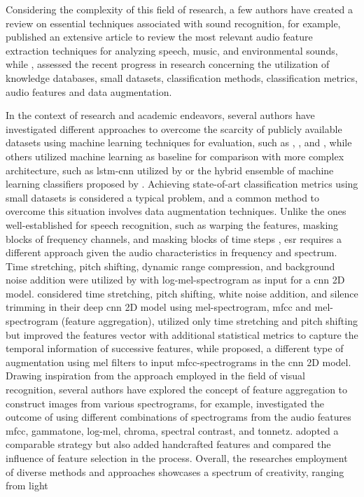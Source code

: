 
Considering the complexity of this field of research, a few authors have created a review on essential techniques associated with sound recognition, for example, \textcite{Alias2016} published an extensive article to review the most relevant audio feature extraction techniques for analyzing speech, music, and environmental sounds, while \textcite{Alli2022}, assessed the recent progress in research concerning the utilization of knowledge databases, small datasets, classification methods, classification metrics, audio features and data augmentation.

In the context of research and academic endeavors, several authors have investigated different approaches to overcome the scarcity of publicly available datasets using machine learning techniques for evaluation, such as \textcite{Salamon2014}, \textcite{Bountourakis2015}, and \textcite{Piczak2015}, while others utilized machine learning as baseline for comparison with more complex architecture, such as \gls{lstm}-\gls{cnn} utilized by \textcite{Pandya2021} or the hybrid ensemble of machine learning classifiers proposed by \textcite{Bansal2022}. Achieving state-of-art classification metrics using small datasets is considered a typical problem, and a common method to overcome this situation involves data augmentation techniques. Unlike the ones well-established for speech recognition, such as warping the features, masking blocks of frequency channels, and masking blocks of time steps \cite{Park2019}, \gls{esr} requires a different approach given the audio characteristics in frequency and spectrum. Time stretching, pitch shifting, dynamic range compression, and background noise addition were utilized by \textcite{Salamon2017} with log-mel-spectrogram as input for a \gls{cnn} 2D model. \textcite{Mushtaq2020a} considered time stretching, pitch shifting, white noise addition, and silence trimming in their deep \gls{cnn} 2D model using mel-spectrogram, \gls{mfcc} and mel-spectrogram (feature aggregation), \textcite{Bountourakis2019} utilized only time stretching and pitch shifting but improved the features vector with additional statistical metrics to capture the temporal information of successive features, while \textcite{Chu2023} proposed, a different type of augmentation using mel filters to input \gls{mfcc}-spectrograms in the \gls{cnn} 2D model. Drawing inspiration from the approach employed in the field of visual recognition, several authors have explored the concept of feature aggregation to construct images from various spectrograms, for example, \textcite{Su2020} investigated the outcome of using different combinations of spectrograms from the audio features \gls{mfcc}, gammatone, log-mel, chroma, spectral contrast, and tonnetz. \textcite{Luz2021} adopted a comparable strategy but also added handcrafted features and compared the influence of feature selection in the process. Overall, the researches employment of diverse methods and approaches showcases a spectrum of creativity, ranging from light 